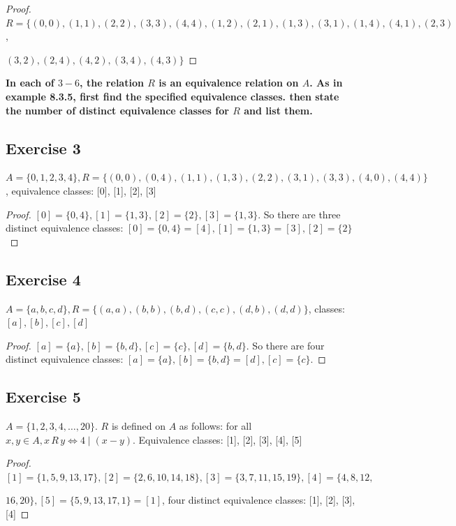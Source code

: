 \documentclass[14pt]{extarticle}
\newcommand{\cy}{\color{cyan}}
\begin{document}
\begin{proof}
        \(R = \{(0,0),(1,1),(2,2),(3,3),(4,4),(1,2),(2,1),(1,3),(3,1),(1,4),(4,1),(2,3)\),

        \((3,2),(2,4),(4,2),(3,4),(4,3)\}\)
\end{proof}

{\bf \cy In each of $3-6$, the relation $R$ is an equivalence relation on $A$. As in example 8.3.5, first
find the specified equivalence classes. then state the number of distinct equivalence classes for $R$ and list them.}

\subsection{Exercise 3}
\(A = \{0, 1, 2, 3, 4\}, R = \{(0, 0), (0, 4), (1, 1), (1, 3), (2, 2), (3, 1), (3, 3), (4, 0), (4, 4)\}\),
equivalence classes: [0], [1], [2], [3]

\begin{proof}
        \([0] = \{0, 4\}, [1] = \{1, 3\}, [2] = \{2\}, [3] = \{1, 3\}\). So there are three distinct equivalence classes:
        \([0] = \{0, 4\} = [4], [1] = \{1, 3\} = [3], [2] = \{2\}\)
\end{proof}

\subsection{Exercise 4}
\(A = \{a, b, c, d\}, R = \{(a, a), (b, b), (b, d), (c, c), (d, b), (d, d)\}\), classes: \([a], [b], [c], [d]\)

\begin{proof}
        \([a] = \{a\}, [b] = \{b, d\}, [c] = \{c\}, [d] = \{b, d\}\). So there are four distinct equivalence classes:
        \([a] = \{a\}, [b] = \{b, d\} = [d], [c] = \{c\}\).
\end{proof}

\subsection{Exercise 5}
\(A = \{1, 2, 3, 4, \ldots, 20\}\). \(R\) is defined on \(A\) as follows: for all \(x, y \in A, x \,R\, y \iff 4
\mid (x - y)\). Equivalence classes: [1], [2], [3], [4], [5]

\begin{proof}
        \([1] = \{1, 5, 9, 13, 17\}, [2] = \{2, 6, 10, 14, 18\}, [3] = \{3, 7, 11, 15, 19\}, [4] = \{4, 8, 12,\)

        \(16, 20\}, [5] = \{5, 9, 13, 17, 1\} = [1]\), four distinct equivalence classes: [1], [2], [3], [4]
\end{proof}
\end{document}
